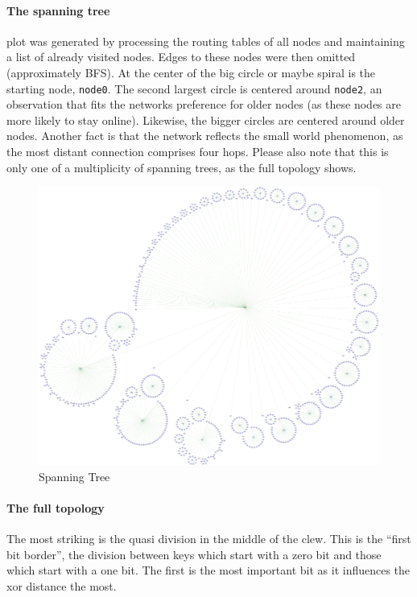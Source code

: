 \documentclass[a4paper,10pt,notitlepage]{article}
\begin{document}
\paragraph{The spanning tree} plot was generated by processing the routing tables of all nodes and maintaining a list of already visited nodes.
Edges to these nodes were then omitted (approximately BFS).
At the center of the big circle or maybe spiral is the starting node, \texttt{node0}.
The second largest circle is centered around \texttt{node2}, an observation that fits the networks preference for older nodes (as these nodes are more likely to stay online).
Likewise, the bigger circles are centered around older nodes.
Another fact is that the network reflects the small world phenomenon, as the most distant connection comprises four hops.
Please also note that this is only one of a multiplicity of  spanning trees, as the full topology shows.
\begin{figure}[htbp]
   \includegraphics[width=15cm]{spanning.png}
   \caption{Spanning Tree}
\end{figure}

\pagebreak
\paragraph{The full topology} The most striking is the quasi division in the middle of the clew.
This is the ``first bit border'', the division between keys which start with a zero bit and those which start with a one bit.
The first is the most important bit as it influences the xor distance the most.
\end{document}

